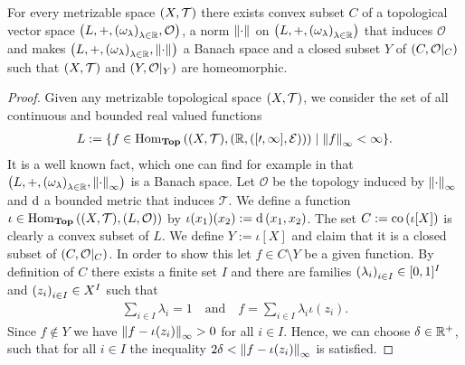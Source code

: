 \begin{theorem} \label{theorem:met_banach}
	For every metrizable space $\tspace$ there exists convex subset $C$ of a topological vector space $\tvspace{\R}$, a norm $\norm{\cdot}$ on $\pbraces{L, +, \pbraces{\omega_\lambda}_{\lambda \in \R}}$ that induces $\mathcal{O}$ and makes $\tvspace[\norm{\cdot}]{\R}$ a Banach space and a closed subset $Y$ of $\reltspace[C][O]$ such that $\tspace$ and $\reltspace[Y][O]$ are homeomorphic. 
\end{theorem}
\begin{proof}
	Given any metrizable topological space $\tspace$, we consider the set of all continuous and bounded real valued functions
	\begin{align*}
		L := \Bbraces{f \in \Hom_\Top\pbraces{\tspace, \tspace[\R][\eucl]} \mid \norm[\infty]{f} < \infty}. 
	\end{align*}
	It is a well known fact, which one can find for example in \cite{Ana1&2} that $\tvspace[\norm[\infty]{\cdot}]{\R}$ is a Banach space. Let $\mathcal{O}$ be the topology induced by $\norm[\infty]{\cdot}$ and $\metric$ a bounded metric that induces $\mathcal{T}$. We define a function $\iota \in \Hom_\Top\pbraces{\tspace, \tspace[L][O]}$ by $\iota(x_1)(x_2) := \metric\pbraces{x_1, x_2}$. The set $C := \conv\pbraces{\iota[X]}$ is clearly a convex subset of $L$. We define $Y := \iota[X]$ and claim that it is a closed subset of $\reltspace[C][O]$. In order to show this let $f \in C \setminus Y$ be a given function. By definition of $C$ there exists a finite set $I$ and there are families $\pbraces{\lambda_i}_{i \in I} \in [0, 1]^I$ and $\pbraces{z_i}_{i \in I} \in X^I$ such that 
	\begin{align*}
		\sum_{i \in I} \lambda_i = 1 \quad \text{and} \quad f = \sum_{i \in I} \lambda_i \iota(z_i).  
	\end{align*}
	Since $f \notin Y$ we have $\norm[\infty]{f - \iota\pbraces{z_i}} > 0$ for all $i \in I$. Hence, we can choose $\delta \in \R^+$, such that for all $i \in I$ the inequality $2\delta < \norm[\infty]{f - \iota\pbraces{z_i}}$ is satisfied. 
	

\end{proof}
